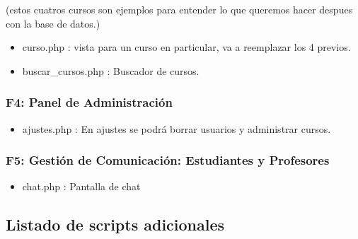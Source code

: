 \documentclass[
]{article}
\providecommand{\tightlist}{%
  \setlength{\itemsep}{0pt}\setlength{\parskip}{0pt}}
\begin{document}
(estos cuatros cursos son ejemplos para entender lo que queremos hacer
despues con la base de datos.)

\begin{itemize}
\item
  curso.php : vista para un curso en particular, va a reemplazar los 4
  previos.
\item
  buscar\_cursos.php : Buscador de cursos.
\end{itemize}

\subsubsection{F4: Panel de
Administración}\label{f4-panel-de-administraciuxf3n}

\begin{itemize}
\tightlist
\item
  ajustes.php : En ajustes se podrá borrar usuarios y administrar
  cursos.
\end{itemize}

\subsubsection{F5: Gestión de Comunicación: Estudiantes y
Profesores}\label{f5-gestiuxf3n-de-comunicaciuxf3n-estudiantes-y-profesores}

\begin{itemize}
\tightlist
\item
  chat.php : Pantalla de chat
\end{itemize}

\vspace{12mm}

\subsection{Listado de scripts
adicionales}\label{listado-de-scripts-adicionales}
\end{document}
